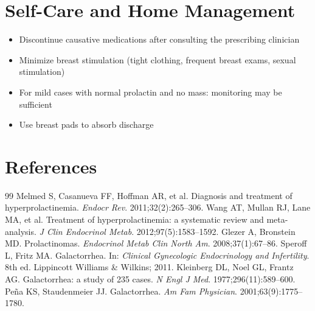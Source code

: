 \section*{Self-Care and Home Management}
\begin{itemize}
  \item Discontinue causative medications after consulting the prescribing clinician
  \item Minimize breast stimulation (tight clothing, frequent breast exams, sexual stimulation)
  \item For mild cases with normal prolactin and no mass: monitoring may be sufficient
  \item Use breast pads to absorb discharge
\end{itemize}

\section*{References}
\begin{thebibliography}{99}
Melmed S, Casanueva FF, Hoffman AR, et al. Diagnosis and treatment of hyperprolactinemia. \textit{Endocr Rev}. 2011;32(2):265--306.
Wang AT, Mullan RJ, Lane MA, et al. Treatment of hyperprolactinemia: a systematic review and meta-analysis. \textit{J Clin Endocrinol Metab}. 2012;97(5):1583--1592.
Glezer A, Bronstein MD. Prolactinomas. \textit{Endocrinol Metab Clin North Am}. 2008;37(1):67--86.
Speroff L, Fritz MA. Galactorrhea. In: \textit{Clinical Gynecologic Endocrinology and Infertility}. 8th ed. Lippincott Williams \& Wilkins; 2011.
Kleinberg DL, Noel GL, Frantz AG. Galactorrhea: a study of 235 cases. \textit{N Engl J Med}. 1977;296(11):589--600.
Pe\~{n}a KS, Staudenmeier JJ. Galactorrhea. \textit{Am Fam Physician}. 2001;63(9):1775--1780.
\end{thebibliography}
